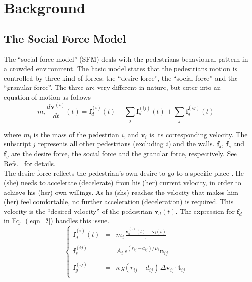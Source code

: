 \section{\label{background}Background}

\subsection{The Social Force Model}

The ``social force model'' (SFM) deals with the pedestrians behavioural 
pattern in a crowded environment. The basic model states that the 
pedestrians motion is controlled by three kind of forces: the ``desire force'', 
the ``social force'' and the ``granular force''. The three are very different in 
 nature, but enter into an equation of motion as follows  \\ 


\begin{equation}
m_i\,\displaystyle\frac{d\mathbf{v}^{(i)}}{dt}(t)=\mathbf{f}_d^{(i)}
(t)+\displaystyle\sum_{j}\displaystyle\mathbf{f}_s^{(ij)}(t)+\displaystyle\sum_{
j}\mathbf{f}_g^{(ij)}(t)\label{eqn_1}
\end{equation}

\noindent where $m_i$ is the mass of the pedestrian $i$, and $\mathbf{v}_i$ is 
its corresponding velocity. The subscript $j$ represents all other pedestrians 
(excluding $i$) and the walls. $\mathbf{f}_d$, $\mathbf{f}_s$ and 
$\mathbf{f}_g$ are the desire force, the social force and the granular force, 
respectively. See Refs.~\cite{Helbing1,Dorso1,Dorso2,Dorso3,Dorso4} for 
details.\\

The desire force reflects the pedestrian's own desire to go to a specific 
place \cite{Helbing1}. He (she) needs to accelerate (decelerate) from his (her) 
current velocity, in order to achieve his (her) own willings. As he (she) 
reaches the velocity that makes him (her) feel comfortable, no further 
acceleration (deceleration) is required. This velocity is the ``desired 
velocity'' of the pedestrian $\mathbf{v}_d(t)$. The expression for 
$\mathbf{f}_d$ in Eq.~(\ref{eqn_2}) handles this issue.  \\


\begin{equation}
\left\{\begin{array}{lcl}
        \mathbf{f}_d^ {(i)}(t) & = & m_i\,\displaystyle\frac{\mathbf{v}_d^
{(i)}(t)-\mathbf{v}_i(t)}{\tau} \\
        & & \\
\mathbf{f}_s^{(ij)} & = & A_i\,e^{(r_{ij}-d_{ij})/B_i}\mathbf{n}_{ij}\\
        & & \\
\mathbf{f}_g^{(ij)} &= &\kappa\,g(r_{ij}-d_{ij})\,\Delta
\mathbf{v}_{ij}\cdot\mathbf{t}_{ij} \\
       \end{array}\right.\label{eqn_2}
\end{equation}

